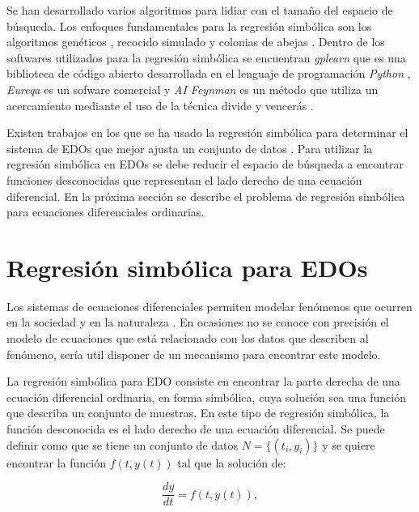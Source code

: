 Se han desarrollado varios algoritmos para lidiar con el tamaño del espacio de búsqueda. Los enfoques fundamentales para la regresión simbólica son los algoritmos genéticos \cite{koza1994genetic, schmidt2013eureqa, gaucel2014learning}, recocido simulado \cite{turing_bot} y colonias de abejas \cite{multihive,karaboga2010artificial}. Dentro de los softwares utilizados para la regresión simbólica se encuentran \textit{gplearn} que es una biblioteca de código abierto desarrollada en el lenguaje de programación \textit{Python} \cite{gplearn}, \textit{Eureqa} es un sofware  comercial \cite{schmidt2013eureqa} y \textit{AI Feynman} es un método que utiliza un acercamiento mediante el uso de la técnica divide y vencerás \cite{udrescu2020ai}.

Existen trabajos en los que se ha usado la regresión simbólica para determinar el sistema de EDOs que mejor ajusta un conjunto de datos \cite{koza1994genetic, iba2008inference, gaucel2014learning, kronberger2019identification}. Para utilizar la regresión simbólica en EDOs se debe reducir el espacio de búsqueda a encontrar funciones desconocidas que representan el lado derecho de una ecuación diferencial. En la próxima sección se describe el problema de regresión simbólica para ecuaciones diferenciales ordinarias.

\section{Regresión simbólica para EDOs}\label{section:symbolic_regression_in_does}

Los sistemas de ecuaciones diferenciales permiten modelar fenómenos que ocurren en la sociedad y en la naturaleza \cite{weiss2013sir, udrescu2020ai, kuddus2021mathematical}. En ocasiones no se conoce con precisión el modelo de ecuaciones que está relacionado con los datos que describen al fenómeno, sería util disponer de un mecanismo para encontrar este modelo.

La regresión simbólica para EDO consiste en encontrar la parte derecha de una ecuación diferencial ordinaria, en forma simbólica, cuya solución sea una función que describa un conjunto de muestras. En este tipo de regresión simbólica, la función desconocida es el lado derecho de una ecuación diferencial. Se puede definir como que se tiene un conjunto de datos $N = \{(t_i, y_i)\}$ y se quiere encontrar la función $f(t, y(t))$ tal que la solución de:

\begin{equation*}
    \frac{dy}{dt} = f(t, y(t)),
\end{equation*}


